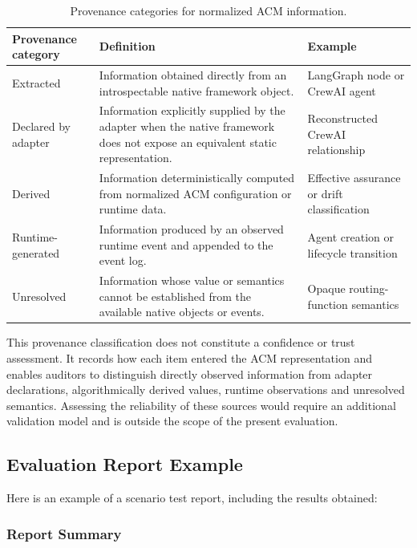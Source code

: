 \documentclass[10pt]{article}
\begin{document}
\begin{table}[t]
\centering
\caption{Provenance categories for normalized ACM information.}
\label{tab:information_provenance}
\begin{tabularx}{\linewidth}{lXX}
\toprule
Provenance category &
Definition &
Example \\
\midrule

Extracted &
Information obtained directly from an introspectable native framework object. &
LangGraph node or CrewAI agent \\

Declared by adapter &
Information explicitly supplied by the adapter when the native framework does not expose an equivalent static representation. &
Reconstructed CrewAI relationship \\

Derived &
Information deterministically computed from normalized ACM configuration or runtime data. &
Effective assurance or drift classification \\

Runtime-generated &
Information produced by an observed runtime event and appended to the event log. &
Agent creation or lifecycle transition \\

Unresolved &
Information whose value or semantics cannot be established from the available native objects or events. &
Opaque routing-function semantics \\

\bottomrule
\end{tabularx}
\end{table}
This provenance classification does not constitute a confidence or trust
assessment. It records how each item entered the ACM representation and enables
auditors to distinguish directly observed information from adapter declarations,
algorithmically derived values, runtime observations and unresolved semantics.
Assessing the reliability of these sources would require an additional
validation model and is outside the scope of the present evaluation.

\subsection{Evaluation Report Example}
Here is an example of a scenario test report, including the results obtained:

\subsubsection{Report Summary}
\end{document}
